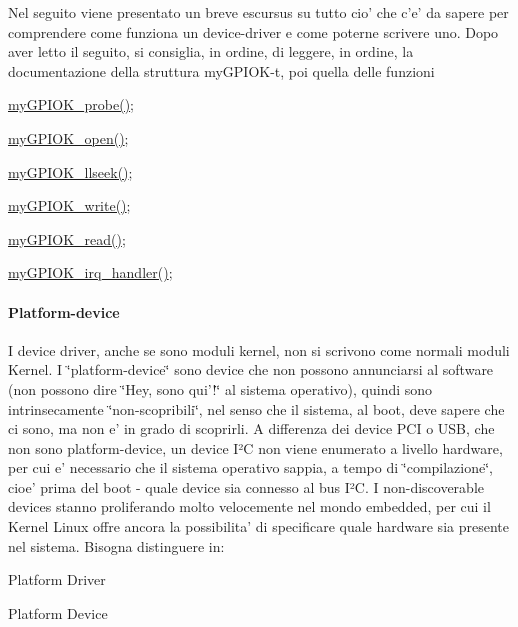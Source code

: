 Nel seguito viene presentato un breve escursus su tutto cio' che c'e' da sapere per comprendere come funziona un device-\/driver e come poterne scrivere uno. Dopo aver letto il seguito, si consiglia, in ordine, di leggere, in ordine, la documentazione della struttura my\+G\+P\+I\+O\+K-\/t, poi quella delle funzioni
\begin{DoxyItemize}
\item \hyperlink{group___linux-_driver_gae40973a06d72f7c41a9af07513a62307}{my\+G\+P\+I\+O\+K\+\_\+probe()};
\item \hyperlink{group___linux-_driver_gad013759c18fbf6ea96005b9b3bfa5b4e}{my\+G\+P\+I\+O\+K\+\_\+open()};
\item \hyperlink{group___linux-_driver_ga66e7f726b72320a272b633ecbaecefff}{my\+G\+P\+I\+O\+K\+\_\+llseek()};
\item \hyperlink{group___linux-_driver_ga1eea0f6c86e8966ba9b701da57502aad}{my\+G\+P\+I\+O\+K\+\_\+write()};
\item \hyperlink{group___linux-_driver_ga90ac339df9c02ae5f11a2a7727adc923}{my\+G\+P\+I\+O\+K\+\_\+read()};
\item \hyperlink{group___linux-_driver_ga2fc230a12a97aa63e43b2dc4aec73511}{my\+G\+P\+I\+O\+K\+\_\+irq\+\_\+handler()};
\end{DoxyItemize}

\paragraph*{Platform-\/device}

I device driver, anche se sono moduli kernel, non si scrivono come normali moduli Kernel. I \char`\"{}platform-\/device\char`\"{} sono device che non possono annunciarsi al software (non possono dire \char`\"{}\+Hey,
sono qui'!\char`\"{} al sistema operativo), quindi sono intrinsecamente \char`\"{}non-\/scopribili\char`\"{}, nel senso che il sistema, al boot, deve sapere che ci sono, ma non e' in grado di scoprirli. A differenza dei device P\+C\+I o U\+S\+B, che non sono platform-\/device, un device I²\+C non viene enumerato a livello hardware, per cui e' necessario che il sistema operativo sappia, a tempo di \char`\"{}compilazione\char`\"{}, cioe' prima del boot -\/ quale device sia connesso al bus I²\+C. I non-\/discoverable devices stanno proliferando molto velocemente nel mondo embedded, per cui il Kernel Linux offre ancora la possibilita' di specificare quale hardware sia presente nel sistema. Bisogna distinguere in\+:
\begin{DoxyItemize}
\item Platform Driver
\item Platform Device
\end{DoxyItemize}

